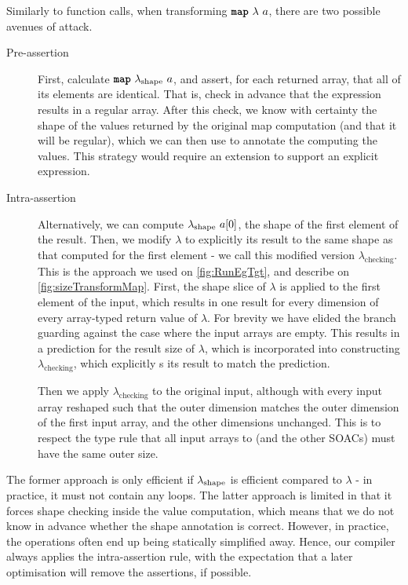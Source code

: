 Similarly to function calls, when transforming $\mbox{\texttt{\bfseries{map}}}~\lambda~a$,
there are two possible avenues of attack.

\begin{description}
\item[Pre-assertion] First, calculate $\mbox{\texttt{\bfseries{map}}}~\lambda_{\textrm{shape}}~a$, and
  assert, for each returned array, that all of its elements are
  identical. That is, check in advance that the  expression
  results in a regular array.  After this check, we know with
  certainty the shape of the values returned by the original map
  computation (and that it will be regular), which we can then use to
  annotate the  computing the values.  This strategy would
  require an extension to support an explicit  expression.

\item[Intra-assertion] Alternatively, we can compute
  \(\lambda_{\textrm{shape}}~a[0]\), the shape of the first element of the
  result.  Then, we modify $\lambda$ to explicitly  its
  result to the same shape as that computed for the first element - we
  call this modified version \(\lambda_{\textrm{checking}}\).  This is
  the approach we used on \cref{fig:RunEgTgt}, and describe on
  \cref{fig:sizeTransformMap}.  First, the shape slice of $\lambda$ is
  applied to the first element of the input, which results in one
  result for every dimension of every array-typed return value of
  $\lambda$.  For brevity we have elided the branch guarding against
  the case where the input arrays are empty.  This results in a
  prediction for the result size of $\lambda$, which is incorporated
  into constructing $\lambda_{\text{checking}}$, which explicitly
  s its result to match the prediction.

  Then we apply $\lambda_{\text{checking}}$ to the original input,
  although with every input array reshaped such that the outer
  dimension matches the outer dimension of the first input array, and
  the other dimensions unchanged.  This is to respect the type rule
  that all input arrays to  (and the other SOACs) must have
  the same outer size.
\end{description}

The former approach is only efficient if \(\lambda_{\text{\textrm{shape}}}\)
is efficient compared to \(\lambda\) - in practice, it must not
contain any loops.  The latter approach is limited in that it forces
shape checking inside the value computation, which means that we do
not know in advance whether the shape annotation is correct.  However,
in practice, the  operations often end up being statically
simplified away.  Hence, our compiler always applies the
intra-assertion rule, with the expectation that a later optimisation
will remove the assertions, if possible.


